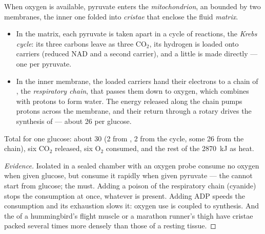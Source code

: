 \begin{proposition}\label{prop:g12:respiration-fermentation:mitochondrion}
When oxygen is available, pyruvate enters the \emph{mitochondrion},
an  bounded by two membranes, the inner one folded into
\emph{cristae} that enclose the fluid \emph{matrix}.
\begin{itemize}
  \item In the matrix, each pyruvate is taken apart in a cycle of
        reactions, the \emph{Krebs cycle}: its
        three carbons leave as three $\mathrm{CO_2}$, its hydrogen is
        loaded onto carriers (reduced NAD and a second carrier), and a
        little  is made directly --- one per pyruvate.
  \item In the inner membrane, the loaded carriers hand their
        electrons to a chain of , the \emph{respiratory
        chain}, that passes them down to oxygen, which combines with
        protons to form water. The energy released along the chain
        pumps protons across the membrane, and their return through a
        rotary  drives the synthesis of  --- about 26 per
        glucose.
\end{itemize}
Total for one glucose: about 30  (2 from , 2 from the
cycle, some 26 from the chain), six $\mathrm{CO_2}$ released, six
$\mathrm{O_2}$ consumed, and the rest of the \qty{2870}{kJ} as heat.
\end{proposition}
\begin{proof}[Evidence]
Isolated  in a sealed chamber with an oxygen probe
consume no oxygen when given glucose, but consume it rapidly when
given pyruvate --- the  cannot start from glucose; the
 must. Adding a poison of the respiratory chain (cyanide)
stops the consumption at once, whatever  is present. Adding
ADP speeds the consumption and its exhaustion slows it: oxygen use is
coupled to  synthesis. And the  of a hummingbird's
flight muscle or a marathon runner's thigh have cristae packed
several times more densely than those of a resting tissue.
\end{proof}

